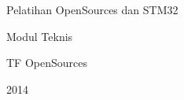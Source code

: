 \documentclass[11pt,fleqn]{book} %
\begin{document}
\begingroup
\thispagestyle{empty}
  \centering
  \vspace*{9cm}
  \par\normalfont\fontsize{35}{35}\sffamily\selectfont
  Pelatihan OpenSources dan STM32\par %
  \vspace*{1cm}
  {\Huge Modul Teknis}\par %
  \vspace*{1cm}
  {\large TF OpenSources}\par
  {\large 2014}\par
\endgroup
\end{document}
